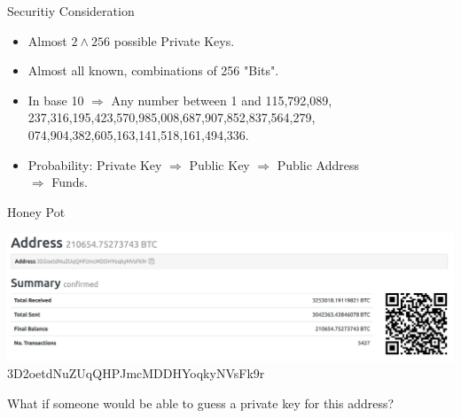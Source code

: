 \documentclass[handout]{beamer}
\begin{document}
\begin{frame}{Securitiy Consideration}

\begin{itemize}
		\item<1-> Almost $2\wedge256$ possible Private Keys.
		\item<2-> Almost all known, combinations of 256 "Bits".
		\item<3-> In base 10 $\Rightarrow$ Any number between 1 and 115,792,089,\\
		237,316,195,423,570,985,008,687,907,852,837,564,279, \\
		074,904,382,605,163,141,518,161,494,336.
		\item<4-> Probability: Private Key $\Rightarrow$ Public Key $\Rightarrow$ Public Address \\ $\Rightarrow$ Funds. 
	\end{itemize}

\end{frame}

\begin{frame}{Honey Pot}

\begin{center}
\includegraphics[width = 10 cm, frame]{../assets/images/honeypot}
3D2oetdNuZUqQHPJmcMDDHYoqkyNVsFk9r \\
\end{center}
\vspace{1em}
What if someone would be able to guess a private  key for this address?

\end{frame}
\end{document}
